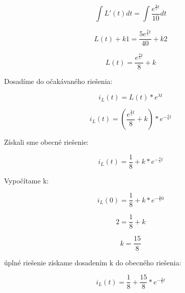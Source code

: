 \documentclass[a4paper,12pt]{article}
\begin{document}
\begin{equation*}
  \int L\prime (t)dt = \int \frac{e^{\frac{4}{5}t}}{10}dt
\end{equation*}

\begin{equation*}
  L(t) + k1 = \frac{5e^{\frac{4}{5}t}}{40} +k2
\end{equation*}

\begin{equation*}
  L(t) = \frac{e^{\frac{4}{5}t}}{8} + k
\end{equation*}

\begin{flushleft}
Dosadíme do očakávaného riešenia: 
\end{flushleft}

\begin{equation*}
  i_L(t) = L(t)*e^{\lambda t}
\end{equation*}

\begin{equation*}
  i_L(t) = (\frac{e^{\frac{4}{5}t}}{8} + k) *e^{-\frac{4}{5}t}
\end{equation*}

\begin{flushleft}
Získali sme obecné riešenie:  
\end{flushleft}

\begin{equation*}
  i_L(t) = \frac{1}{8} + k*e^{-\frac{4}{5}t}
\end{equation*}

\begin{flushleft}
Vypočítame k: 
\end{flushleft}

\begin{equation*}
  i_L(0) = \frac{1}{8} + k*e^{-\frac{4}{5}0}
\end{equation*}

\begin{equation*}
  2 = \frac{1}{8} + k
\end{equation*}

\begin{equation*}
  k = \frac{15}{8}
\end{equation*}

\begin{flushleft}
úplné riešenie získame dosadením k do obecného riešenia: 
\end{flushleft}

\begin{equation*}
  i_L(t) = \frac{1}{8} + \frac{15}{8}*e^{-\frac{4}{5}t}
\end{equation*}
\end{document}
